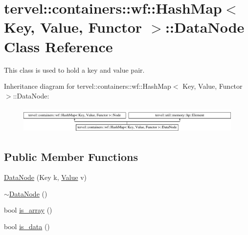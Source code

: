 \hypertarget{classtervel_1_1containers_1_1wf_1_1_hash_map_1_1_data_node}{}\section{tervel\+:\+:containers\+:\+:wf\+:\+:Hash\+Map$<$ Key, Value, Functor $>$\+:\+:Data\+Node Class Reference}
\label{classtervel_1_1containers_1_1wf_1_1_hash_map_1_1_data_node}


This class is used to hold a key and value pair.  


Inheritance diagram for tervel\+:\+:containers\+:\+:wf\+:\+:Hash\+Map$<$ Key, Value, Functor $>$\+:\+:Data\+Node\+:\begin{figure}[H]
\begin{center}
\leavevmode
\includegraphics[height=1.403509cm]{classtervel_1_1containers_1_1wf_1_1_hash_map_1_1_data_node}
\end{center}
\end{figure}
\subsection*{Public Member Functions}
\begin{DoxyCompactItemize}
\item 
\hyperlink{classtervel_1_1containers_1_1wf_1_1_hash_map_1_1_data_node_ada4006f1254608301c4c19a08efc9f91}{Data\+Node} (Key k, \hyperlink{hash__map_2test_object_8h_ad777bf08d8e2b01df17ba5e3c51ae11f}{Value} v)
\item 
\hyperlink{classtervel_1_1containers_1_1wf_1_1_hash_map_1_1_data_node_afcd1913936c926974b4bfbe95c18559c}{$\sim$\+Data\+Node} ()
\item 
bool \hyperlink{classtervel_1_1containers_1_1wf_1_1_hash_map_1_1_data_node_a3b607ee5aaa378bd16f398c11708769e}{is\+\_\+array} ()
\item 
bool \hyperlink{classtervel_1_1containers_1_1wf_1_1_hash_map_1_1_data_node_a4a5c4a7e2de1b689d515d8d97322599d}{is\+\_\+data} ()
\end{DoxyCompactItemize}
